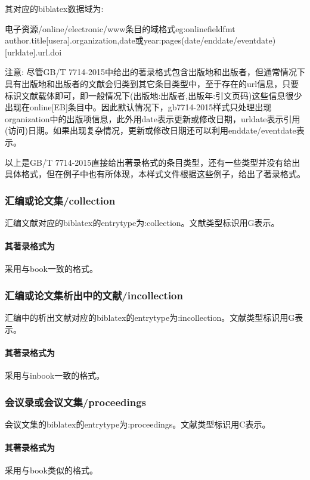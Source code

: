 其对应的biblatex数据域为:
\begin{codetex}{电子资源/online/electronic/www条目的域格式}{eg:onlinefieldfmt}
author.title[usera].organization,date或year:pages(date/enddate/eventdate)[urldate].url.doi
\end{codetex}

注意: 尽管GB/T 7714-2015中给出的著录格式包含出版地和出版者，但通常情况下具有出版地和出版者的文献会归类到其它条目类型中，至于存在的url信息，只要标识文献载体即可，即一般情况下(出版地:出版者,出版年:引文页码)这些信息很少出现在online[EB]条目中。因此默认情况下，gb7714-2015样式只处理出现organization中的出版项信息，此外用date表示更新或修改日期，urldate表示引用(访问)日期。如果出现复杂情况，更新或修改日期还可以利用enddate/eventdate表示。

以上是GB/T 7714-2015直接给出著录格式的条目类型，还有一些类型并没有给出具体格式，但在例子中也有所体现，本样式文件根据这些例子，给出了著录格式。

\subsubsection{汇编或论文集/collection}

\begin{refentry}{}{}
汇编文献对应的biblatex的entrytype为:collection。文献类型标识用G表示。

\paragraph{其著录格式为} 采用与book一致的格式。
\end{refentry}

\subsubsection{汇编或论文集析出中的文献/incollection}
\begin{refentry}{}{}
汇编中的析出文献对应的biblatex的entrytype为:incollection。文献类型标识用G表示。

\paragraph{其著录格式为} 采用与inbook一致的格式。
\end{refentry}

\subsubsection{会议录或会议文集/proceedings}
\begin{refentry}{}{}
会议文集的biblatex的entrytype为:proceedings。文献类型标识用C表示。

\paragraph{其著录格式为} 采用与book类似的格式。
\end{refentry}

